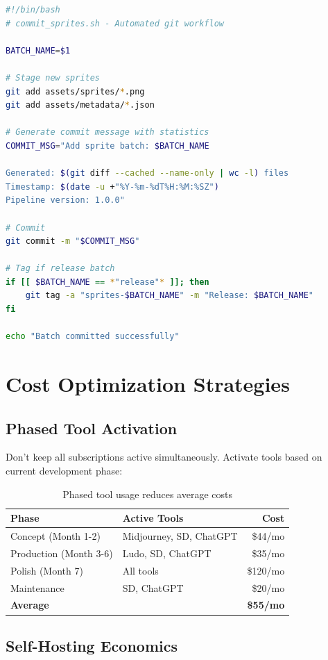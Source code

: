\documentclass[11pt]{article}
\begin{document}
\begin{lstlisting}[language=bash, caption={Git workflow for sprite assets}]
#!/bin/bash
# commit_sprites.sh - Automated git workflow

BATCH_NAME=$1

# Stage new sprites
git add assets/sprites/*.png
git add assets/metadata/*.json

# Generate commit message with statistics
COMMIT_MSG="Add sprite batch: $BATCH_NAME

Generated: $(git diff --cached --name-only | wc -l) files
Timestamp: $(date -u +"%Y-%m-%dT%H:%M:%SZ")
Pipeline version: 1.0.0"

# Commit
git commit -m "$COMMIT_MSG"

# Tag if release batch
if [[ $BATCH_NAME == *"release"* ]]; then
    git tag -a "sprites-$BATCH_NAME" -m "Release: $BATCH_NAME"
fi

echo "Batch committed successfully"
\end{lstlisting}

\section{Cost Optimization Strategies}

\subsection{Phased Tool Activation}

Don't keep all subscriptions active simultaneously. Activate tools based on current development phase:

\begin{table}[H]
\centering
\begin{tabular}{lp{7cm}r}
\toprule
\textbf{Phase} & \textbf{Active Tools} & \textbf{Cost} \\
\midrule
Concept (Month 1-2) & Midjourney, SD, ChatGPT & \$44/mo \\
Production (Month 3-6) & Ludo, SD, ChatGPT & \$35/mo \\
Polish (Month 7) & All tools & \$120/mo \\
Maintenance & SD, ChatGPT & \$20/mo \\
\midrule
\textbf{Average} & & \textbf{\$55/mo} \\
\bottomrule
\end{tabular}
\caption{Phased tool usage reduces average costs}
\end{table}

\subsection{Self-Hosting Economics}
\end{document}

